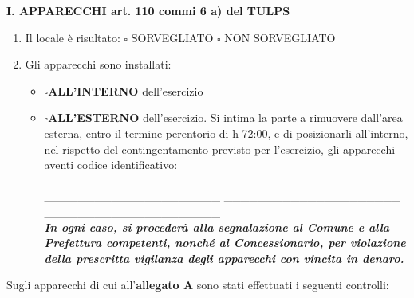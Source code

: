 \documentclass[12pt]{article}
\begin{document}
\begin{center}
    \textbf{I. APPARECCHI art. 110 commi 6 a) del TULPS}
\end{center}
\begin{enumerate}[resume]
    \item Il locale è risultato:
    \begin{math} \square\end{math} SORVEGLIATO \begin{math}\square\end{math} NON SORVEGLIATO
    \item Gli apparecchi sono installati:
    \begin{itemize}[label={}]
        \item \begin{math}\square\end{math}\textbf{ALL'INTERNO} dell'esercizio
        \item \begin{math}\square\end{math}\textbf{ALL’ESTERNO} dell’esercizio. Si intima la parte a rimuovere dall’area esterna, entro il termine perentorio di h 72:00,  e di posizionarli all’interno, nel rispetto del contingentamento previsto per l’esercizio, gli apparecchi aventi codice identificativo:\\
        \_\_\_\_\_\_\_\_\_\_\_\_\_\_\_\_\_\_\_\_\_ \_\_\_\_\_\_\_\_\_\_\_\_\_\_\_\_\_\_\_\_\_ \_\_\_\_\_\_\_\_\_\_\_\_\_\_\_\_\_\_\_\_\_ \_\_\_\_\_\_\_\_\_\_\_\_\_\_\_\_\_\_\_\_\_ \_\_\_\_\_\_\_\_\_\_\_\_\_\_\_\_\_\_\_\_\_ \\
        \textbf{\textit{In ogni caso, si procederà alla segnalazione al Comune e alla Prefettura competenti, nonché al Concessionario, per violazione della prescritta vigilanza degli apparecchi con vincita in denaro.}}
    \end{itemize}
\end{enumerate}

Sugli apparecchi di cui all’\textbf{allegato A} sono stati effettuati i seguenti controlli:
\end{document}
